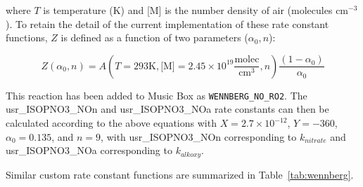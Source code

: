 \documentclass[titlepage]{article}
\begin{document}
\noindent where $T$ is temperature (K) and [M] is the number density of air (molecules $\mbox{cm}^{-3}$).
To retain the detail of the current implementation of these rate constant functions, $Z$ is defined as a function of two parameters ($\alpha_0, n$):

\begin{equation}
Z( \alpha_0, n) = A(T = 293 \mbox{K}, \mbox{[M]} = 2.45 \times 10^{19} \frac{\mbox{molec}}{\mbox{cm}^3}, n) \frac{(1-\alpha_0)}{\alpha_0}
\end{equation}

This reaction has been added to Music Box as \verb>WENNBERG_NO_RO2>. The usr\_ISOPNO3\_NOn and usr\_ISOPNO3\_NOa rate constants can then be calculated according to the above equations with $X = 2.7 \times 10^{-12}$, $Y = -360$, $\alpha_0 = 0.135$, and $n = 9$, with usr\_ISOPNO3\_NOn corresponding to $k_{nitrate}$ and usr\_ISOPNO3\_NOa corresponding to $k_{alkoxy}$.

Similar custom rate constant functions are summarized in Table~\ref{tab:wennberg}.
\end{document}
